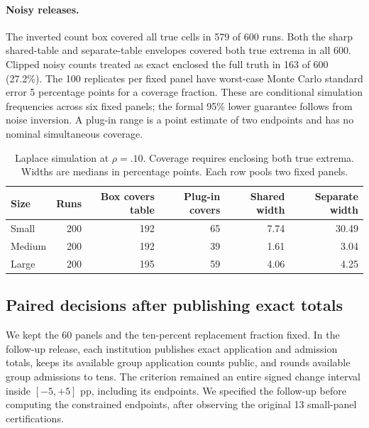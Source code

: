 \documentclass[11pt]{article}
\begin{document}
\paragraph{Noisy releases.}
The inverted count box covered all true cells in 579 of 600 runs. Both the sharp shared-table and separate-table envelopes covered both true extrema in all 600. Clipped noisy counts treated as exact enclosed the full truth in 163 of 600 (27.2\%). The 100 replicates per fixed panel have worst-case Monte Carlo standard error 5 percentage points for a coverage fraction. These are conditional simulation frequencies across six fixed panels; the formal 95\% lower guarantee follows from noise inversion. A plug-in range is a point estimate of two endpoints and has no nominal simultaneous coverage.
\begin{table}[ht]
\centering
\caption{Laplace simulation at $\rho=.10$. Coverage requires enclosing both true extrema. Widths are medians in percentage points. Each row pools two fixed panels.}
\begin{tabular}{lrrrrr}
\toprule
Size & Runs & Box covers table & Plug-in covers & Shared width & Separate width\\
\midrule
Small & 200 & 192 & 65 & 7.74 & 30.49\\
Medium & 200 & 192 & 39 & 1.61 & 3.04\\
Large & 200 & 195 & 59 & 4.06 & 4.25\\
\bottomrule
\end{tabular}
\end{table}

\subsection{Paired decisions after publishing exact totals}
We kept the 60 panels and the ten-percent replacement fraction fixed. In the follow-up release, each institution publishes exact application and admission totals, keeps its available group application counts public, and rounds available group admissions to tens. The criterion remained an entire signed change interval inside $[-5,+5]$ pp, including its endpoints. We specified the follow-up before computing the constrained endpoints, after observing the original 13 small-panel certifications.
\end{document}

